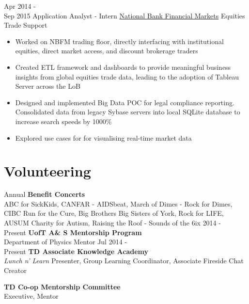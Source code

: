 \documentclass[letterpaper]{twentysecondcv} %
\begin{document}
\begin{twenty}
     \twentyitem
   		{Apr 2014 - \\ Sep 2015}
        {Application Analyst - Intern}
        {\href{http://nbfm.ca/}{National Bank Financial Markets}}
        {Equities Trade Support}
        {
        \begin{itemize}
		\item Worked on NBFM trading floor, directly interfacing with institutional equities, direct market access, and discount brokerage traders
        \item Created ETL framework and  dashboards to provide meaningful business insights from global equities trade data, leading to the adoption of Tableau Server across the LoB
        \item Designed and implemented  Big Data POC for legal compliance reporting. Consolidated data from legacy Sybase servers into local SQLite database to increase search speeds by 1000\% 
        \item Explored use cases for  for visualising real-time market data
	    \end{itemize}
    	}
        
\end{twenty}

\vfill
\section{Volunteering}
\begin{twentyshort}
\twentyitemshort
		{Annual}
		{\textbf{Benefit Concerts} \\ ABC for SickKids, CANFAR - AIDSbeat, March of Dimes - Rock for Dimes, CIBC Run for the Cure, Big Brothers Big Sisters of York, Rock for LIFE, AUSUM Charity for Autism, Raising the Roof - Sounds of the 6ix}
\twentyitemshort
   		{2014 - \\ Present}
        {\textbf{UofT A\& S Mentorship Program} \\ Department of Physics Mentor}
\twentyitemshort
   		{Jul 2014 - \\ Present}
        {\textbf{TD Associate Knowledge Academy} \\ \emph{Lunch n' Learn} Presenter, Group Learning Coordinator, Associate Fireside Chat Creator}

\twentyitemshort
   		{}
        {\textbf{TD Co-op Mentorship Committee} \\ Executive, Mentor}
\end{twentyshort}
\end{document}
